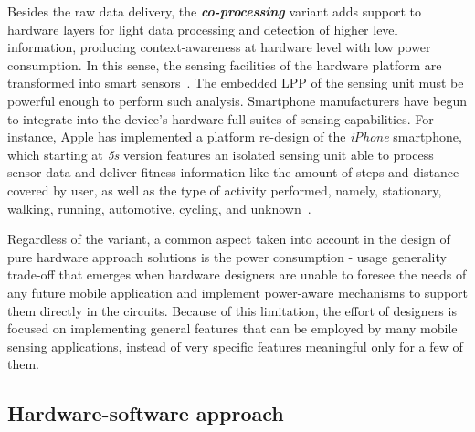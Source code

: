 \documentclass[ENG,PhD]{cinvestav}
\begin{document}
Besides the raw data delivery, the \emph{\textbf{co-processing}} variant adds support to hardware layers for light data processing and detection of higher level information, producing context-awareness at hardware level with low power consumption.
In this sense, the sensing facilities of the hardware platform are transformed into smart sensors~\cite{Gervais-Ducouret2011}.
The embedded LPP of the sensing unit must be powerful enough to perform such analysis.
Smartphone manufacturers have begun to integrate into the device's hardware full suites of sensing capabilities.
For instance, Apple has implemented a platform re-design of the \emph{iPhone} smartphone, which starting at \emph{5s} version features an isolated sensing unit able to process sensor data and deliver fitness information like the amount of steps and distance covered by user, as well as the type of activity performed, namely, stationary, walking, running, automotive, cycling, and unknown~\cite{Apple2015}.

Regardless of the variant, a common aspect taken into account in the design of pure hardware approach solutions is the power consumption - usage generality trade-off that emerges when hardware designers are unable to foresee the needs of any future mobile application and implement power-aware mechanisms to support them directly in the circuits.
Because of this limitation, the effort of designers is focused on implementing general features that can be employed by many mobile sensing applications, instead of very specific features meaningful only for a few of them.

\subsection{Hardware-software approach}
\end{document}
